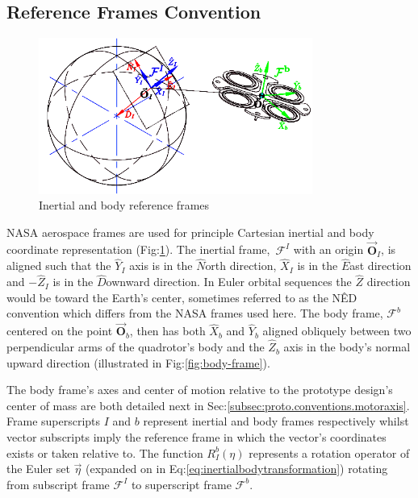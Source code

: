 \subsection{Reference Frames Convention}
\label{subsec:proto.conventions.frames}
\begin{figure}[htbp]
\centering
\includegraphics[width=0.8\textwidth]{figs/reference-frame}
\caption{Inertial and body reference frames}
\label{fig:ref_frame}
\end{figure}
NASA aerospace frames are used for principle Cartesian inertial and body coordinate representation (Fig:\ref{fig:ref_frame}). The inertial frame,~$\mathcal{F}^I$ with an origin $\vec{\mathbf{O}}_I$, is aligned such that the $\hat{Y}_I$ axis is in the $\hat{N}$orth direction, $\hat{X}_I$ is in the $\hat{E}$ast direction and $-\hat{Z}_I$ is  in the $\hat{D}$ownward direction. In Euler orbital sequences the $\hat{Z}$ direction would be toward the Earth's center, sometimes referred to as the N\^{E}D convention which differs from the NASA frames used here. The body frame, $\mathcal{F}^b$ centered on the point $\vec{\mathbf{O}}_b$, then has both $\hat{X}_b$ and $\hat{Y}_b$ aligned obliquely between two perpendicular arms of the quadrotor's body and the $\hat{Z}_b$ axis in the body's normal upward direction (illustrated in Fig:\ref{fig:body-frame}). 
\par
The body frame's axes and center of motion relative to the prototype design's center of mass are both detailed next in Sec:\ref{subsec:proto.conventions.motoraxis}. Frame superscripts $I$ and $b$ represent inertial and body frames respectively whilst vector subscripts imply the reference frame in which the vector's coordinates exists or taken relative to. The function $R_I^b(\eta)$ represents a rotation operator of the Euler set $\vec{\eta}$ (expanded on in Eq:\ref{eq:inertialbodytransformation}) rotating from subscript frame $\mathcal{F}^I$ to superscript frame $\mathcal{F}^b$. 
